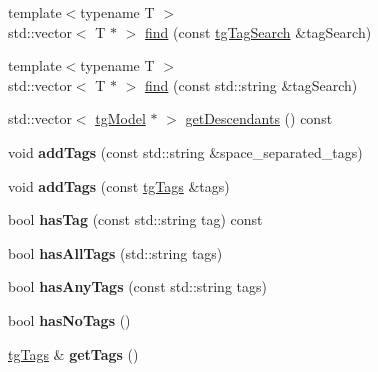 \begin{DoxyCompactItemize}
\item 
{\footnotesize template$<$typename T $>$ }\\std\-::vector$<$ T $\ast$ $>$ \hyperlink{classtg_model_ab75836fdfbd9200f165c3b28a19630c0}{find} (const \hyperlink{classtg_tag_search}{tg\-Tag\-Search} \&tag\-Search)
\item 
{\footnotesize template$<$typename T $>$ }\\std\-::vector$<$ T $\ast$ $>$ \hyperlink{classtg_model_aa40b5fb32f8941e04d537f4e6c6db35c}{find} (const std\-::string \&tag\-Search)
\item 
std\-::vector$<$ \hyperlink{classtg_model}{tg\-Model} $\ast$ $>$ \hyperlink{classtg_model_a2efa4321fa5c77b4ce23b01f6fd3a1c4}{get\-Descendants} () const 
\item 
\hypertarget{classtg_taggable_af0b8f1729653b0b90d2fecbd51163612}{void {\bfseries add\-Tags} (const std\-::string \&space\-\_\-separated\-\_\-tags)}\label{classtg_taggable_af0b8f1729653b0b90d2fecbd51163612}

\item 
\hypertarget{classtg_taggable_af28e3fe1a7e4eb28772dc006d575dd1f}{void {\bfseries add\-Tags} (const \hyperlink{classtg_tags}{tg\-Tags} \&tags)}\label{classtg_taggable_af28e3fe1a7e4eb28772dc006d575dd1f}

\item 
\hypertarget{classtg_taggable_ae31f65869c8887bfeb34a344902c4d5b}{bool {\bfseries has\-Tag} (const std\-::string tag) const }\label{classtg_taggable_ae31f65869c8887bfeb34a344902c4d5b}

\item 
\hypertarget{classtg_taggable_a33b77b1075171b63f673965687b2e844}{bool {\bfseries has\-All\-Tags} (std\-::string tags)}\label{classtg_taggable_a33b77b1075171b63f673965687b2e844}

\item 
\hypertarget{classtg_taggable_af14af28fa98021c4f20a5e8f2ddd5606}{bool {\bfseries has\-Any\-Tags} (const std\-::string tags)}\label{classtg_taggable_af14af28fa98021c4f20a5e8f2ddd5606}

\item 
\hypertarget{classtg_taggable_adff345e116e16420c701a748ff8f995f}{bool {\bfseries has\-No\-Tags} ()}\label{classtg_taggable_adff345e116e16420c701a748ff8f995f}

\item 
\hypertarget{classtg_taggable_acf1d7fa9df8f374f25015c4080902681}{\hyperlink{classtg_tags}{tg\-Tags} \& {\bfseries get\-Tags} ()}\label{classtg_taggable_acf1d7fa9df8f374f25015c4080902681}


\end{DoxyCompactItemize}
